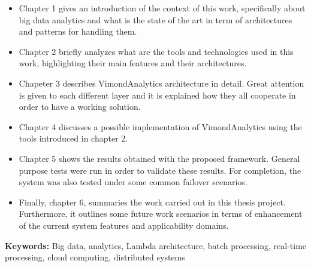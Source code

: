 \begin{itemize}
\item Chapter 1 gives an introduction of the context of this work, specifically about big data analytics and what is the state of the art in term of architectures and patterns for handling them. 
\item Chapter 2 briefly analyzes what are the tools and technologies used in this work, highlighting their main features and their architectures.
\item Chapeter 3 describes VimondAnalytics architecture in detail. Great attention is given to each different layer and it is explained how they all cooperate in order to have a working solution.
\item Chapter 4 discusses a possible implementation of VimondAnalytics using the tools introduced in chapter 2.
\item Chapter 5 shows the results obtained with the proposed framework. General purpose tests were run in order to validate these results. For completion, the system was also tested under some common failover scenarios.
\item Finally, chapter 6, summaries the work carried out in this thesis project. Furthermore, it outlines some future work scenarios in terms of enhancement of the current system features and applicability domains. 
\end{itemize}
\vspace{\fill}
\textbf{Keywords:}
Big data, analytics, Lambda architecture, batch processing, real-time processing, cloud computing, distributed systems